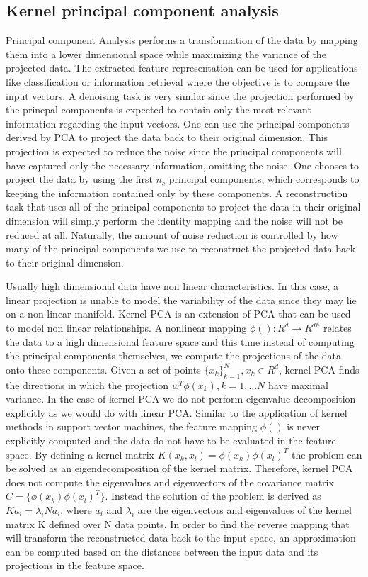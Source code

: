 \documentclass[conference,compsoc]{IEEEtran}
\begin{document}
\subsection{Kernel principal component analysis}
Principal component Analysis performs a transformation of the data by mapping them into a lower dimensional space while maximizing the variance of the projected data. The extracted feature representation can be used for applications like classification or information retrieval where the objective is to compare the input vectors. A denoising task is very similar since the projection performed by the princpal components is expected to contain only the most relevant information regarding the input vectors. One can use the principal components derived by PCA to project the data back to their original dimension. This projection is expected to reduce the noise since the principal components will have captured only the necessary information, omitting the noise. One chooses to project the data by using the first $n_c$ principal components, which corresponds to keeping the information contained only by these components. A reconstruction task that uses all of the principal components to project the data in their original dimension will simply perform the identity mapping and the noise will not be reduced at all. Naturally, the amount of noise reduction is controlled by how many of the principal components we use to reconstruct the projected data back to their original dimension. 

Usually high dimensional data have non linear characteristics. In this case, a linear projection is unable to model the variability of the data since they may lie on a non linear manifold. Kernel PCA is an extension of PCA that can be used to model non linear relationships. A nonlinear mapping $\phi(): R^d \rightarrow R^{dh}$ relates the data to a high dimensional feature space and this time instead of computing the principal components themselves, we compute the projections of the data onto these components. Given a set of points $\{x_k\}^N_{k=1}, x_k \in R^d$, kernel PCA finds the directions in which the projection $w^T\phi(x_k), k=1,...N$ have maximal variance. In the case of kernel PCA we do not perform eigenvalue decomposition explicitly as we would do with linear PCA. Similar to the application of kernel methods in support vector machines, the feature mapping $\phi()$ is never explicitly computed and the data do not have to be evaluated in the feature space. By defining a kernel matrix $K(x_k,x_l)=\phi(x_k)\phi(x_l)^T$ the problem can be solved as an eigendecomposition of the kernel matrix. Therefore, kernel PCA does not compute the eigenvalues and eigenvectors of the covariance matrix $C=\{\phi(x_k)\phi(x_l)^T\}$. Instead the solution of the problem is derived as $Ka_i=\lambda_i Na_i$, where $a_i$ and $\lambda_i$ are the eigenvectors and eigenvalues of the kernel matrix K defined over N data points. In order to find the reverse mapping that will transform the reconstructed data back to the input space, an approximation can be computed based on the distances between the input data and its projections in the feature space.
\end{document}
